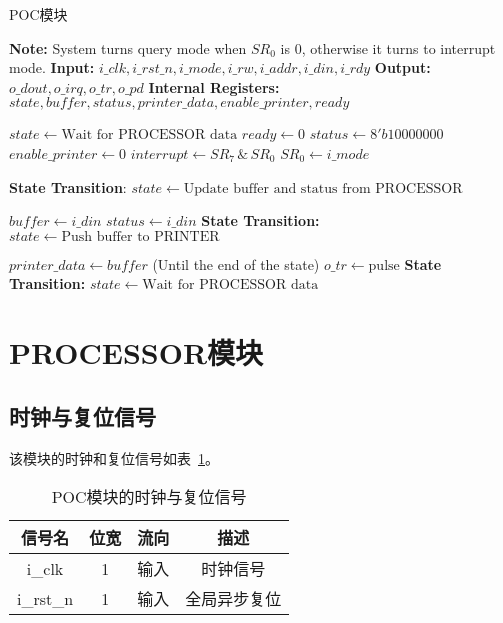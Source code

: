 \documentclass[lang=cn,a4paper,newtx]{elegantpaper}
\begin{document}
\begin{algorithm}[H]
    
    \caption{POC模块}
    \label{alg:POC}
    \begin{algorithmic}[1]
    \State \textbf{Note:} System turns query mode when $SR_0$ is 0, otherwise it turns to interrupt mode.
    \State \textbf{Input:} $i\_clk, i\_rst\_n, i\_mode, i\_rw, i\_addr, i\_din, i\_rdy$
    \State \textbf{Output:} $o\_dout, o\_irq, o\_tr, o\_pd$
    \State \textbf{Internal Registers:} $state, buffer, status, printer\_data, enable\_printer, ready$
    
        \State $state \gets \text{Wait for PROCESSOR data}$
        \State $ready \gets 0$
        \State $status \gets 8'b10000000$
        \State $enable\_printer \gets 0$
        \State $interrupt \gets SR_7 \,\&\, SR_0$
        \State $SR_0 \gets i\_mode$
    \EndProcedure
    
    \State \textbf{State Transition}:
            \State $state \gets \text{Update buffer and status from PROCESSOR}$
        \EndIf
    \EndProcedure
    
                \State $buffer \gets i\_din$
                \State $status \gets i\_din$
            \EndIf
        \EndIf
        \State \textbf{State Transition:}
            \State $state \gets \text{Push buffer to PRINTER}$
        \EndIf
    \EndProcedure
    
            \State $printer\_data \gets buffer$ (Until the end of the state)
            \State $o\_tr \gets \text{pulse}$
            \State \textbf{State Transition:}
            \State $state \gets \text{Wait for PROCESSOR data}$
        \EndIf
    \EndProcedure
    \end{algorithmic}
    \end{algorithm}

\section{PROCESSOR模块}
\subsection{时钟与复位信号}
该模块的时钟和复位信号如表~\ref{tab:clk_processor}。
\begin{table}[htbp]
    \centering
    \renewcommand{\arraystretch}{1.2} %
    \begin{tabular}{c c c c}
        \toprule
        信号名 & 位宽 & 流向 & 描述 \\
        \midrule
        i\_clk   & 1 & 输入 & 时钟信号\\
        i\_rst\_n & 1 & 输入 & 全局异步复位\\
        \bottomrule
    \end{tabular}
    \caption{POC模块的时钟与复位信号}
    \label{tab:clk_processor}
\end{table}
\end{document}
